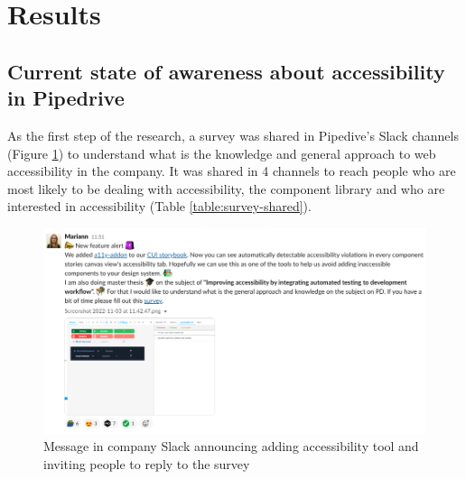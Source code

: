 \documentclass{master_thesis}
\begin{document}
\section{Results} \label{chap:results}




\subsection{Current state of awareness about accessibility in Pipedrive}

As the first step of the research, a survey was shared in Pipedive's Slack channels (Figure \ref{fig:slack-message}) to understand what is the knowledge and general approach to web accessibility in the company. It was shared in 4 channels to reach people who are most likely to be dealing with accessibility, the component library and who are interested in accessibility (Table \ref{table:survey-shared}).

\begin{figure}[ht]
	\centering
	\includegraphics[width=\textwidth]{img/survey.png}
	\caption[Message in company Slack about accessibility tool and survey]{Message in company Slack announcing adding accessibility tool and inviting people to reply to the survey}
	\label{fig:slack-message}
\end{figure}
\end{document}
